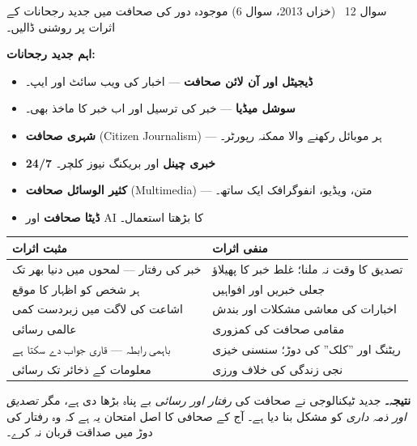 \begin{sawal}{سوال \textenglish{12} \ \textnormal{\small(خزاں \textenglish{2013}، سوال \textenglish{6})}}
موجودہ دور کی صحافت میں جدید رجحانات کے اثرات پر روشنی ڈالیں۔
\end{sawal}

\begin{hal}
\textbf{اہم جدید رجحانات:}
\begin{itemize}\setlength{\itemsep}{1pt}
  \item \textbf{ڈیجیٹل اور آن لائن صحافت} --- اخبار کی ویب سائٹ اور ایپ۔
  \item \textbf{سوشل میڈیا} --- خبر کی ترسیل اور اب خبر کا ماخذ بھی۔
  \item \textbf{شہری صحافت} (\textenglish{Citizen Journalism}) --- ہر
        موبائل رکھنے والا ممکنہ رپورٹر۔
  \item \textbf{\textenglish{24/7} خبری چینل} اور بریکنگ نیوز کلچر۔
  \item \textbf{کثیر الوسائل صحافت} (\textenglish{Multimedia}) --- متن،
        ویڈیو، انفوگرافک ایک ساتھ۔
  \item \textbf{ڈیٹا صحافت} اور \textenglish{AI} کا بڑھتا استعمال۔
\end{itemize}

\medskip
\begin{center}
\begin{tabular}{@{}p{7.0cm} p{7.0cm}@{}}
\toprule
\textbf{مثبت اثرات} & \textbf{منفی اثرات} \\
\midrule
خبر کی رفتار --- لمحوں میں دنیا بھر تک & تصدیق کا وقت نہ ملنا؛ غلط خبر کا پھیلاؤ \\
ہر شخص کو اظہار کا موقع & جعلی خبریں اور افواہیں \\
اشاعت کی لاگت میں زبردست کمی & اخبارات کی معاشی مشکلات اور بندش \\
عالمی رسائی & مقامی صحافت کی کمزوری \\
باہمی رابطہ --- قاری جواب دے سکتا ہے & ریٹنگ اور ''کلک'' کی دوڑ؛ سنسنی خیزی \\
معلومات کے ذخائر تک رسائی & نجی زندگی کی خلاف ورزی \\
\bottomrule
\end{tabular}
\end{center}

\medskip
\textbf{نتیجہ۔} جدید ٹیکنالوجی نے صحافت کی \emph{رفتار اور رسائی} بے پناہ بڑھا
دی ہے، مگر \emph{تصدیق اور ذمہ داری} کو مشکل بنا دیا ہے۔ آج کے صحافی کا اصل
امتحان یہ ہے کہ وہ رفتار کی دوڑ میں صداقت قربان نہ کرے۔

\end{hal}

